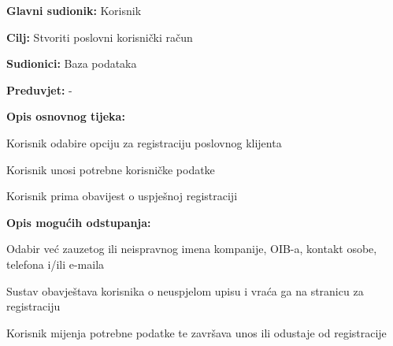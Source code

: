 					\noindent {}
					\begin{packed_item}
						
						\item \textbf{Glavni sudionik: } Korisnik
						\item  \textbf{Cilj:} Stvoriti poslovni korisnički račun
						\item  \textbf{Sudionici:} Baza podataka
						\item  \textbf{Preduvjet:} -
						\item  \textbf{Opis osnovnog tijeka:}
						
						\item[] \begin{packed_enum}
							
							\item Korisnik odabire opciju za registraciju poslovnog klijenta
							\item Korisnik unosi potrebne korisničke podatke
							\item Korisnik prima obavijest o uspješnoj registraciji
						\end{packed_enum}
						
						\item  \textbf{Opis mogućih odstupanja:}
						
						\item[] \begin{packed_item}
							
							\item[2.a]  Odabir već zauzetog ili neispravnog imena kompanije, OIB-a, kontakt osobe, telefona i/ili e-maila
							\item[] \begin{packed_enum}
								
								\item Sustav obavještava korisnika o neuspjelom upisu i vraća ga na stranicu za registraciju
								\item  Korisnik mijenja potrebne podatke te završava unos ili odustaje od registracije
								
							\end{packed_enum}
						\end{packed_item}
					\end{packed_item}
				
